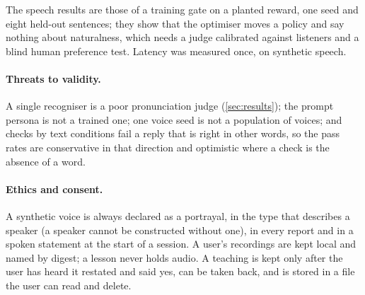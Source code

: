 The speech results are those of a training gate on a planted reward, one seed and eight held-out sentences; they show that the optimiser moves a policy and say nothing about naturalness, which needs a judge calibrated against listeners and a blind human preference test. Latency was measured once, on synthetic speech.

\paragraph{Threats to validity.}
A single recogniser is a poor pronunciation judge (\cref{sec:results}); the prompt persona is not a trained one; one voice seed is not a population of voices; and checks by text conditions fail a reply that is right in other words, so the pass rates are conservative in that direction and optimistic where a
check is the absence of a word.

\paragraph{Ethics and consent.}
A synthetic voice is always declared as a portrayal, in the type that describes a speaker (a speaker cannot be constructed without one), in every report and in a spoken statement at the start of a session. A user's recordings are kept local and named by digest; a lesson never holds audio.
A teaching is kept only after the user has heard it restated and said yes, can be taken back, and is stored in a file the user can read and delete.
